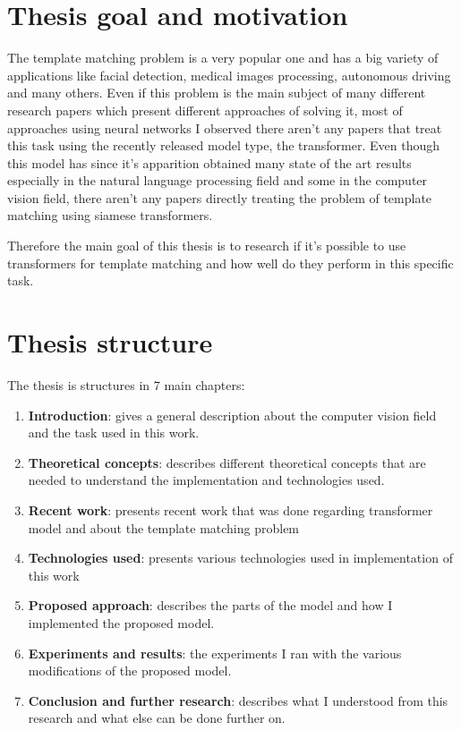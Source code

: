 \documentclass{report}[12pt, a4paper]
\begin{document}
\section{Thesis goal and motivation}

The template matching problem is a very popular one and has a big variety of applications like facial detection, medical images processing, autonomous driving and many others. Even if this problem is the main subject of many different research papers which present different approaches of solving it, most of approaches using neural networks I observed there aren't any papers that treat this task using the recently released model type, the transformer. Even though this model has since it's apparition obtained many state of the art results especially in the natural language processing field and some in the computer vision field, there aren't any papers directly treating the problem of template matching using siamese transformers.

Therefore the main goal of this thesis is to research if it's possible to use transformers for template matching and how well do they perform in this specific task.

\section{Thesis structure}

The thesis is structures in 7 main chapters:

\begin{enumerate}
    \item \textbf{Introduction}: gives a general description about the computer vision field and the task used in this work.
    \item \textbf{Theoretical concepts}: describes different theoretical concepts that are needed to understand the implementation and technologies used.
    \item \textbf{Recent work}: presents recent work that was done regarding transformer model and about the template matching problem
    \item \textbf{Technologies used}: presents various technologies used in implementation of this work
    \item \textbf{Proposed approach}: describes the parts of the model and how I implemented the proposed model.
    \item \textbf{Experiments and results}: the experiments I ran with the various modifications of the proposed model.
    \item \textbf{Conclusion and further research}: describes what I understood from this research and what else can be done further on.
\end{enumerate}
\end{document}
